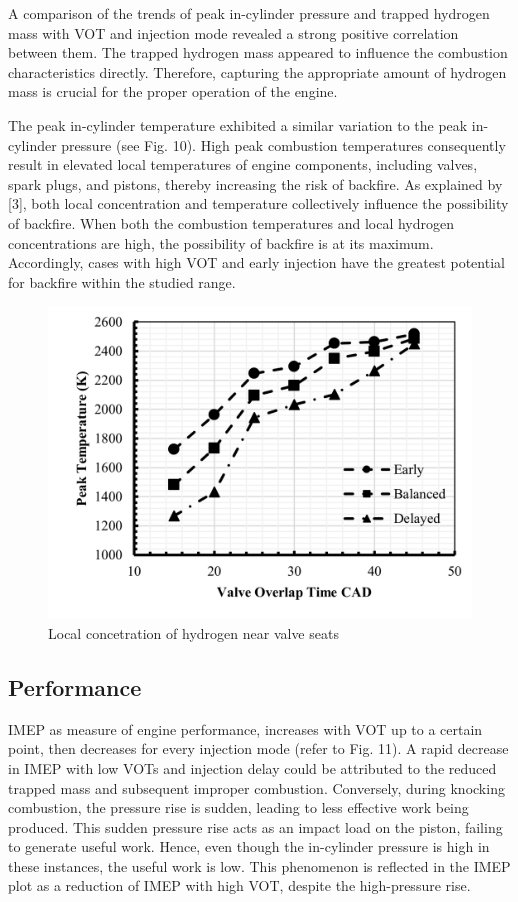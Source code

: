 \documentclass[conference]{IEEEtran}
\begin{document}
A comparison of the trends of peak in-cylinder pressure and trapped hydrogen mass with VOT and injection mode revealed a strong positive correlation between them. 
The trapped hydrogen mass appeared to influence the combustion characteristics directly. 
Therefore, capturing the appropriate amount of hydrogen mass is crucial for the proper operation of the engine.

The peak in-cylinder temperature exhibited a similar variation to the peak in-cylinder pressure (see Fig. 10). 
High peak combustion temperatures consequently result in elevated local temperatures of engine components, including valves, spark plugs, and pistons, thereby increasing the risk of backfire. 
As explained by [3], both local concentration and temperature collectively influence the possibility of backfire. 
When both the combustion temperatures and local hydrogen concentrations are high, the possibility of backfire is at its maximum. 
Accordingly, cases with high VOT and early injection have the greatest potential for backfire within the studied range.


\begin{figure}[htbp]
    \centerline{\includegraphics{plots and graphs/10.png}}
    \caption{Local concetration of hydrogen near valve seats}
    \label{plt_10}
    \end{figure}

\subsection{Performance}
IMEP as measure of engine performance, increases with VOT up to a certain point, then decreases for every injection mode (refer to Fig. 11). 
A rapid decrease in IMEP with low VOTs and injection delay could be attributed to the reduced trapped mass and subsequent improper combustion. 
Conversely, during knocking combustion, the pressure rise is sudden, leading to less effective work being produced. 
This sudden pressure rise acts as an impact load on the piston, failing to generate useful work. 
Hence, even though the in-cylinder pressure is high in these instances, the useful work is low. 
This phenomenon is reflected in the IMEP plot as a reduction of IMEP with high VOT, despite the high-pressure rise.
\end{document}

